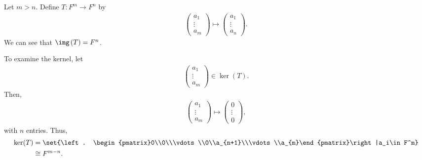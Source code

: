 \documentclass[10pt]{mypackage}
\begin{document}
\begin{example}
  Let $m > n$. Define $T: F^{m}\rightarrow F^n$ by
  \begin{align*}
    \begin{pmatrix}a_1\\\vdots\\a_m\end{pmatrix} \mapsto \begin{pmatrix}a_1\\\vdots\\a_n\end{pmatrix}.
  \end{align*}
  We can see that $\img\left(T\right) = F^n$.\newline

  To examine the kernel, let
  \begin{align*}
    \begin{pmatrix}a_1\\\vdots\\a_m\end{pmatrix}\in \ker(T).
  \end{align*}
  Then,
  \begin{align*}
    \begin{pmatrix}a_1\\\vdots\\a_m\end{pmatrix}\mapsto \begin{pmatrix}0\\\vdots\\0\end{pmatrix},
  \end{align*}
  with $n$ entries. Thus,
  \begin{align*}
    \ker(T) &= \set{\left. \begin{pmatrix}0\\0\\\vdots\\0\\a_{n+1}\\\vdots\\a_{m}\end{pmatrix}\right|a_i\in F^m}\\
            &\cong F^{m-n}.
  \end{align*}
\end{example}
\end{document}
